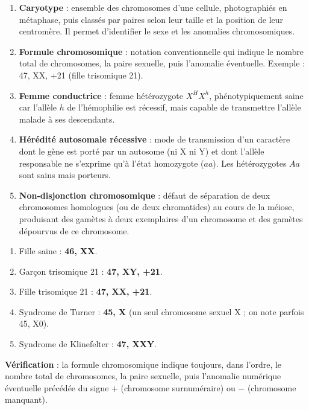 \documentclass[11pt]{article}
\begin{document}
\begin{corrige}
\begin{enumerate}
\item \textbf{Caryotype} : ensemble des chromosomes d'une cellule, photographiés en métaphase, puis classés par paires selon leur taille et la position de leur centromère. Il permet d'identifier le sexe et les anomalies chromosomiques.
\item \textbf{Formule chromosomique} : notation conventionnelle qui indique le nombre total de chromosomes, la paire sexuelle, puis l'anomalie éventuelle. Exemple : 47, XX, +21 (fille trisomique 21).
\item \textbf{Femme conductrice} : femme hétérozygote $X^{H}X^{h}$, phénotypiquement saine car l'allèle $h$ de l'hémophilie est récessif, mais capable de transmettre l'allèle malade à ses descendants.
\item \textbf{Hérédité autosomale récessive} : mode de transmission d'un caractère dont le gène est porté par un autosome (ni X ni Y) et dont l'allèle responsable ne s'exprime qu'à l'état homozygote ($aa$). Les hétérozygotes $Aa$ sont sains mais porteurs.
\item \textbf{Non-disjonction chromosomique} : défaut de séparation de deux chromosomes homologues (ou de deux chromatides) au cours de la méiose, produisant des gamètes à deux exemplaires d'un chromosome et des gamètes dépourvus de ce chromosome.
\end{enumerate}
\end{corrige}

\begin{corrige}
\begin{enumerate}
\item Fille saine : \textbf{46, XX}.
\item Garçon trisomique 21 : \textbf{47, XY, +21}.
\item Fille trisomique 21 : \textbf{47, XX, +21}.
\item Syndrome de Turner : \textbf{45, X} (un seul chromosome sexuel X ; on note parfois 45, X0).
\item Syndrome de Klinefelter : \textbf{47, XXY}.
\end{enumerate}
\textbf{Vérification} : la formule chromosomique indique toujours, dans l'ordre, le nombre total de chromosomes, la paire sexuelle, puis l'anomalie numérique éventuelle précédée du signe + (chromosome surnuméraire) ou $-$ (chromosome manquant).
\end{corrige}
\end{document}

